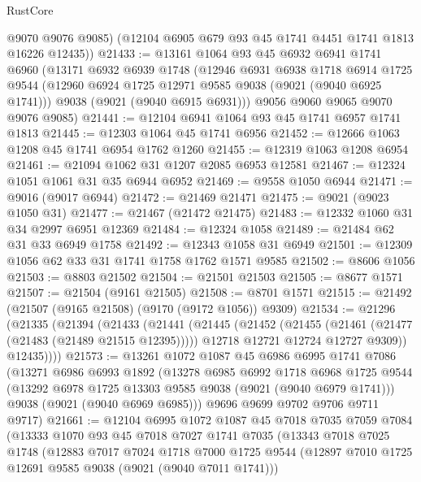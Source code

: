 \begin{lexlean}{RustCore}
\begin{coremodule}
        @9070
        @9076
        @9085)
      (@12104 @6905 @679 @93 @45 @1741 @4451 @1741 @1813 @16226 @12435))
@21433 := @13161
    @1064
    @93
    @45
    @6932
    @6941
    @1741
    @6960
    (@13171
      @6932
      @6939
      @1748
      (@12946
        @6931
        @6938
        @1718
        @6914
        @1725
        @9544
        (@12960 @6924 @1725 @12971 @9585 @9038 (@9021 (@9040 @6925 @1741)))
        @9038
        (@9021 (@9040 @6915 @6931)))
      @9056
      @9060
      @9065
      @9070
      @9076
      @9085)
@21441 := @12104 @6941 @1064 @93 @45 @1741 @6957 @1741 @1813
@21445 := @12303 @1064 @45 @1741 @6956
@21452 := @12666 @1063 @1208 @45 @1741 @6954 @1762 @1260
@21455 := @12319 @1063 @1208 @6954
@21461 := @21094 @1062 @31 @1207 @2085 @6953 @12581
@21467 := @12324 @1051 @1061 @31 @35 @6944 @6952
@21469 := @9558 @1050 @6944
@21471 := @9016 (@9017 @6944)
@21472 := @21469 @21471
@21475 := @9021 (@9023 @1050 @31)
@21477 := @21467 (@21472 @21475)
@21483 := @12332 @1060 @31 @34 @2997 @6951 @12369
@21484 := @12324 @1058
@21489 := @21484 @62 @31 @33 @6949 @1758
@21492 := @12343 @1058 @31 @6949
@21501 := @12309 @1056 @62 @33 @31 @1741 @1758 @1762 @1571 @9585
@21502 := @8606 @1056
@21503 := @8803 @21502
@21504 := @21501 @21503
@21505 := @8677 @1571
@21507 := @21504 (@9161 @21505)
@21508 := @8701 @1571
@21515 := @21492 (@21507 (@9165 @21508) (@9170 (@9172 @1056)) @9309)
@21534 := @21296
    (@21335
      (@21394
        (@21433
          (@21441
            (@21445
              (@21452
                (@21455 (@21461 (@21477 (@21483 (@21489 @21515 @12395)))))
                @12718
                @12721
                @12724
                @12727
                @9309))
            @12435))))
@21573 := @13261
    @1072
    @1087
    @45
    @6986
    @6995
    @1741
    @7086
    (@13271
      @6986
      @6993
      @1892
      (@13278
        @6985
        @6992
        @1718
        @6968
        @1725
        @9544
        (@13292 @6978 @1725 @13303 @9585 @9038 (@9021 (@9040 @6979 @1741)))
        @9038
        (@9021 (@9040 @6969 @6985)))
      @9696
      @9699
      @9702
      @9706
      @9711
      @9717)
@21661 := @12104
    @6995
    @1072
    @1087
    @45
    @7018
    @7035
    @7059
    @7084
    (@13333
      @1070
      @93
      @45
      @7018
      @7027
      @1741
      @7035
      (@13343
        @7018
        @7025
        @1748
        (@12883
          @7017
          @7024
          @1718
          @7000
          @1725
          @9544
          (@12897 @7010 @1725 @12691 @9585 @9038 (@9021 (@9040 @7011 @1741)))

\end{coremodule}
\end{lexlean}
